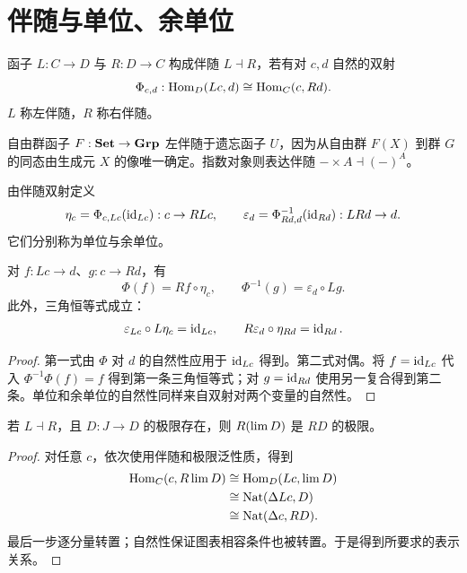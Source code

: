 \section{伴随与单位、余单位}
\begin{definition}[伴随]
函子 $L:C\to D$ 与 $R:D\to C$ 构成伴随 $L\dashv R$，若有对 $c,d$ 自然的双射
\[
\Phi_{c,d}:\operatorname{Hom}_D(Lc,d)\cong\operatorname{Hom}_C(c,Rd).
\]
$L$ 称左伴随，$R$ 称右伴随。
\end{definition}
\begin{example}
自由群函子 $F:\mathbf{Set}\to\mathbf{Grp}$ 左伴随于遗忘函子 $U$，因为从自由群 $F(X)$ 到群 $G$ 的同态由生成元 $X$ 的像唯一确定。指数对象则表达伴随 $-\times A\dashv(-)^A$。
\end{example}
\begin{definition}[单位与余单位]
由伴随双射定义
\[
\eta_c=\Phi_{c,Lc}(\operatorname{id}_{Lc}):c\to RLc,
\qquad
\varepsilon_d=\Phi^{-1}_{Rd,d}(\operatorname{id}_{Rd}):LRd\to d.
\]
它们分别称为单位与余单位。
\end{definition}
\begin{proposition}[伴随的转置公式]
对 $f:Lc\to d$、$g:c\to Rd$，有
\[
\Phi(f)=Rf\circ\eta_c,
\qquad
\Phi^{-1}(g)=\varepsilon_d\circ Lg.
\]
此外，三角恒等式成立：
\[
\varepsilon_{Lc}\circ L\eta_c=\operatorname{id}_{Lc},
\qquad R\varepsilon_d\circ\eta_{Rd}=\operatorname{id}_{Rd}.
\]
\end{proposition}
\begin{proof}
第一式由 $\Phi$ 对 $d$ 的自然性应用于 $\operatorname{id}_{Lc}$ 得到。第二式对偶。将 $f=\operatorname{id}_{Lc}$ 代入 $\Phi^{-1}\Phi(f)=f$ 得到第一条三角恒等式；对 $g=\operatorname{id}_{Rd}$ 使用另一复合得到第二条。单位和余单位的自然性同样来自双射对两个变量的自然性。
\end{proof}
\begin{proposition}[右伴随保持极限]
若 $L\dashv R$，且 $D:J\to D$ 的极限存在，则 $R(\operatorname*{lim} D)$ 是 $RD$ 的极限。
\end{proposition}
\begin{proof}
对任意 $c$，依次使用伴随和极限泛性质，得到
\begin{align*}
\operatorname{Hom}_C(c,R\operatorname*{lim} D)
&\cong\operatorname{Hom}_D(Lc,\operatorname*{lim} D)\\
&\cong\operatorname{Nat}(\Delta Lc,D)\\
&\cong\operatorname{Nat}(\Delta c,RD).
\end{align*}
最后一步逐分量转置；自然性保证图表相容条件也被转置。于是得到所要求的表示关系。
\end{proof}

